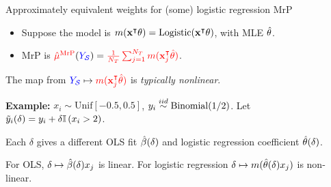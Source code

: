 \begin{frame}[t]{Approximately equivalent weights for (some) logistic regression MrP}

\def\alphav{\mathbf{\alpha}}
%
\begin{itemize}
    \item Suppose the model is $m(\mathbf{x}^\intercal \theta) = \mathrm{Logistic}(\mathbf{x}^\intercal \theta)$, with MLE $\hat{\theta}$.
    \item MrP is $\textcolor{red}{\hat{\mu}^{\mathrm{MrP}}}(\textcolor{blue}{\textcolor{blue}{Y_{\mathcal{S}}}}) = \textcolor{red}{\frac{1}{{\textcolor{red}{N_T}}} \sum_{j=1}^{\textcolor{red}{N_T}} m(\mathbf{x}_j^\intercal \hat{\theta})}$.
\end{itemize}

The map from $\textcolor{blue}{\textcolor{blue}{Y_{\mathcal{S}}}} \mapsto \textcolor{red}{m(\mathbf{x}_j^\intercal \hat{\theta})}$ is
\emph{typically nonlinear}.

\pause
\textbf{Example:} $x_i \sim \mathrm{Unif}[-0.5, 0.5]$, $y_i \overset{iid}{\sim} \mathrm{Binomial}(1/2)$.
%
Let $\tilde{y}_i(\delta) = y_i + \delta \mathbb{I}\left(x_i > 2\right)$.

Each $\delta$ gives a different OLS fit $\hat{\beta}(\delta)$ and logistic regression coefficient $\hat{\theta}(\delta)$.

For OLS, $\delta \mapsto \hat{\beta}(\delta) x_j$ is linear.
%
For logistic regression $\delta \mapsto m(\hat{\theta}(\delta) x_j)$ is non-linear.
\wholeslidefig{
\SimulationPlot{}
}

\end{frame}






